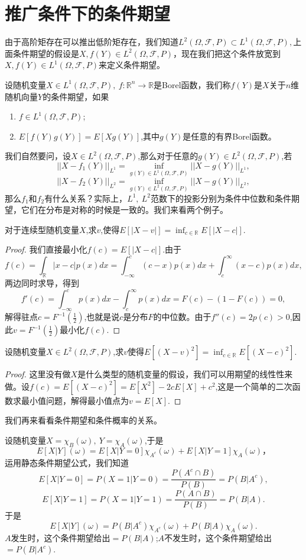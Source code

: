 \documentclass[lang=cn,10pt]{elegantbook}
\begin{document}
	\section{推广条件下的条件期望}
	由于高阶矩存在可以推出低阶矩存在，我们知道\(L^2(\Omega,\mathcal{F},P)\subset L^1(\Omega,\mathcal{F},P),\)上面条件期望的假设是\(X,f(Y)\in L^2(\Omega,\mathcal{F},P)\)，现在我们把这个条件放宽到\(X,f(Y)\in L^1(\Omega,\mathcal{F},P)\)来定义条件期望。
	\begin{definition}[条件期望\((L^1)\)]
		设随机变量\(X\in L^1(\Omega,\mathcal{F},P),\ f:\mathbb{R}^n\to \mathbb{R}\)是Borel函数，我们称\(f(Y)\)是\(X\)关于\(n\)维随机向量\(Y\)的条件期望，如果
		\begin{enumerate}
			\item \(f\in L^1(\Omega,\mathcal{F},P)\);
			\item \(E[f(Y)g(Y)]=E[Xg(Y)]\),其中\(g(Y)\)是任意的有界Borel函数。
		\end{enumerate}
	\end{definition}
	我们自然要问，设\(X\in L^2(\Omega,\mathcal{F},P)\),那么对于任意的\(g(Y)\in L^2(\Omega,\mathcal{F},P)\),若
	\[||X-f_1(Y)||_{L^1}=\inf_{g(Y)\in L^1(\Omega,\mathcal{F},P)}||X-g(Y)||_{L^1},\]
	\[||X-f_2(Y)||_{L^2}=\inf_{g(Y)\in L^2(\Omega,\mathcal{F},P)}||X-g(Y)||_{L^2},\]
	那么\(f_1\)和\(f_2\)有什么关系？实际上，\(L^1,\ L^2\)范数下的投影分别为条件中位数和条件期望，它们在分布是对称的时候是一致的。我们来看两个例子。
	\begin{example}
		对于连续型随机变量\(X\),求\(v\),使得\(E[|X-v|]=\inf_{c\in \mathbb{R}}E[|X-c|].\)
	\end{example}
	\begin{proof}
		我们直接最小化\(f(c)=E[|X-c|].\)由于
		\[f(c)=\int_{\mathbb{R}}|x-c|p(x)dx=\int_{-\infty}^c(c-x)p(x)dx+\int_c^\infty(x-c)p(x)dx,\]
		两边同时求导，得到
		\[f'(c)=\int_{-\infty}^cp(x)dx-\int_c^\infty p(x)dx=F(c)-(1-F(c))=0,\]
		解得驻点\(c=F^{-1}(\frac{1}{2})\),也就是说\(c\)是分布\(F\)的中位数。由于\(f''(c)=2p(c)>0\),因此\(v=F^{-1}(\frac{1}{2})\)最小化\(f(c)\).
	\end{proof}
	\begin{example}
		设随机变量\(X\in L^2(\Omega,\mathcal{F},P)\),求\(v\)使得\(E[(X-v)^2]=\inf_{c\in \mathbb{R}}E[(X-c)^2]\).
	\end{example}
	\begin{proof}
		这里没有做\(X\)是什么类型的随机变量的假设，我们可以用期望的线性性来做。设\(f(c)=E[(X-c)^2]=E[X^2]-2cE[X]+c^2\),这是一个简单的二次函数求最小值问题，解得最小值点为\(v=E[X]\).
	\end{proof}
	我们再来看看条件期望和条件概率的关系。
	\begin{example}
		设随机变量\(X=\chi_{B}(\omega),\ Y=\chi_{A}(\omega)\),于是
		\[E[X|Y](\omega)=E[X|Y=0]\chi_{A^c}(\omega)+E[X|Y=1]\chi_{A}(\omega)，\]
		运用静态条件期望公式，我们知道
		\[E[X|Y=0]=P(X=1|Y=0)=\frac{P(A^c\cap B)}{P(B)}=P(B|A^c),\]
		\[E[X|Y=1]=P(X=1|Y=1)=\frac{P(A\cap B)}{P(B)}=P(B|A).\]
		于是
		\[E[X|Y](\omega)=P(B|A^c)\chi_{A^c}(\omega)+P(B|A)\chi_{A}(\omega).\]
		\(A\)发生时，这个条件期望给出\(=P(B|A)\);\(A\)不发生时，这个条件期望给出\(=P(B|A^c)\).
	\end{example}
\end{document}
